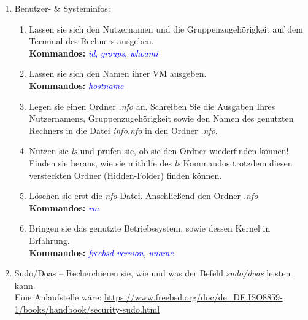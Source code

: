 \documentclass[paper=a4,fontsize=11pt]{scrartcl}%
\numberwithin{equation}{section}
\begin{document}
\begin{enumerate}
\begin{enumerate}[label=(\alph*)]
		\item Kopieren sie die Datei bzw. den Ordner \emph{shell\_tutorial} in das eben angelegte Verzeichnis.\\
		\textbf{Kommandos:} \textcolor{blue}{\emph{cp} }
        \item Kopieren sie die Datei(en) inklusive des Ordners  in das Verzeichnis .\\
        \textbf{Hinweise:} Schauen sie in die Manpage von \emph{cp} um herauszufinden, wie Ordner kopiert werden können.\\
        \textbf{Kommandos:} \textcolor{blue}{\emph{man cp}}
  	\end{enumerate}
  	\footnote{.md steht für Markdown, welches ein Format für Textdateien ist, ähnlich wie .pdf oder .doc-Dateien.}
\newpage        
         \item Benutzer- \& Systeminfos:
    		\begin{enumerate} [label=(\alph*)]
          \item Lassen sie sich den Nutzernamen und die Gruppenzugehörigkeit auf dem Terminal des Rechners ausgeben.\\
          \textbf{Kommandos:} \textcolor{blue}{\emph{id}, \emph{groups}, \emph{whoami}}
          \item Lassen sie sich den Namen ihrer VM ausgeben.\\
          \textbf{Kommandos:} \textcolor{blue}{\emph{hostname}}
          \item Legen sie einen Ordner \emph{.nfo} an. Schreiben Sie die Ausgaben Ihres Nutzernamens, Gruppenzugehörigkeit sowie den Namen des genutzten Rechners in die Datei \emph{info.nfo} in den Ordner \emph{.nfo}.
          \item Nutzen sie \emph{ls} und prüfen sie, ob sie den Ordner wiederfinden können! Finden sie heraus, wie sie mithilfe des \emph{ls} Kommandos trotzdem diesen versteckten Ordner (Hidden-Folder) finden können.
          \item Löschen sie erst die \emph{nfo}-Datei. Anschließend den Ordner \emph{.nfo}\\
          \textbf{Kommandos:} \textcolor{blue}{\emph{rm}}
          \item Bringen sie das genutzte Betriebssystem, sowie dessen Kernel in Erfahrung.\\
          \textbf{Kommandos:} \textcolor{blue}{\emph{freebsd-version}, \emph{uname}}
        \end{enumerate}
        \item Sudo/Doas -- Recherchieren sie, wie und was der Befehl \emph{sudo/doas} leisten kann.\\
        Eine Anlaufstelle wäre: \url{https://www.freebsd.org/doc/de_DE.ISO8859-1/books/handbook/security-sudo.html}
\end{enumerate}
\end{document}
